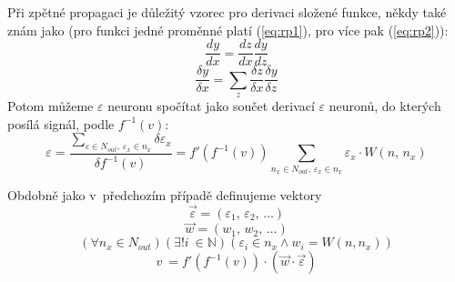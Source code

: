 \documentclass[12pt]{report}			%
\newcommand{\N}{\mathbb{N}}   			%
\begin{document}
				Při zpětné propagaci je důležitý vzorec pro derivaci složené funkce, někdy také znám jako  (pro funkci jedné proměnné platí (\ref{eq:rp1}), pro více pak (\ref{eq:rp2})):
				\begin{equation} \frac{dy}{dx} = \frac{dz}{dx}\frac{dy}{dz} \label{eq:rp1} \end{equation}
				\begin{equation} \frac{\delta y}{\delta x} = \sum_z\frac{\delta z}{\delta x}\frac{\delta y}{\delta z} \label{eq:rp2} \end{equation}
				Potom můžeme $\varepsilon$ neuronu spočítat jako součet derivací $\varepsilon$ neuronů, do kterých posílá signál, podle $f^{-1}(v)$:
				\begin{equation} \varepsilon = \frac{\sum_{\varepsilon \in N_{out},\,\varepsilon_x \in n_x} \delta\varepsilon_x}{\delta f^{-1}(v)} = f'\left(f^{-1}(v)\right) \sum_{n_x \in N_{out},\,\varepsilon_x \in n_x} \varepsilon_x \cdot W\left(n,\,n_x\right) \end{equation}
				
				Obdobně jako v~předchozím případě definujeme vektory
				\begin{equation} \vec{\varepsilon} = (\varepsilon_{1},\,\varepsilon_{2},\,\ldots) \end{equation}
				\begin{equation} \vec{w} = (w_{1},\,w_{2},\,\ldots) \end{equation}
				\begin{equation} \left(\forall n_x \in N_{out}\right)\left(\exists! i~\in \N\right)\left(\varepsilon_i \in n_x \land w_i = W(n, n_x)\right) \end{equation}
				\begin{equation} v~= f'\left(f^{-1}(v)\right)\cdot \left(\vec{w} \cdot \vec{\varepsilon}\right) \end{equation}
				
\end{document}
